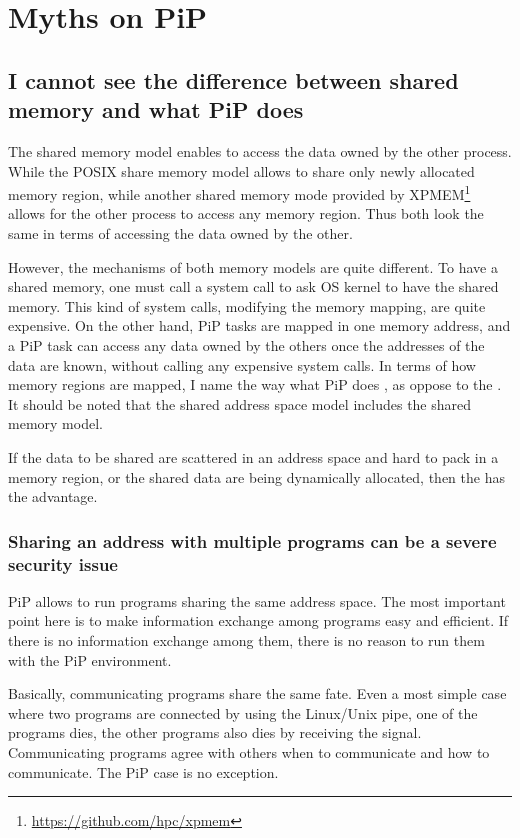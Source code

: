
\section{Myths on PiP}

\subsection*{I cannot see the difference between shared memory and
  what PiP does}\label{sec:shared-memory-myth}

The shared memory model enables to access the data owned by the other
process. While the POSIX share memory model allows to share only newly
allocated memory region, while another shared memory mode provided by 
XPMEM\footnote{\url{https://github.com/hpc/xpmem}} allows for the
other process to access any memory region. Thus both look
the same in terms of accessing the data owned by the other.

However, the mechanisms of both memory models are quite different. To
have a shared memory, one must call a system call to ask OS kernel to
have the shared memory. This kind of system calls, modifying the
memory mapping, are quite expensive. On the other hand, PiP tasks are 
mapped in one memory address, and a PiP task can access any data owned
by the others once the addresses of the data are known, without calling
any expensive system calls. In terms of how memory regions are mapped,
I name the way what PiP does , as
oppose to the . It should be noted that the
shared address space model includes the shared memory model.

If the data to be shared are scattered in an address space and hard to
pack in a memory region, or the shared data are being dynamically
allocated, then the  has the
advantage.  

\subsubsection*{Sharing an address with multiple programs can be a
  severe security issue}\label{sec:security-issue}

PiP allows to run programs sharing the same address space. The
most important point here is to make information exchange among
programs easy and efficient. If there is no information exchange among
them, there is no reason to run them with the PiP environment.

Basically, communicating programs share the same fate. Even a most
simple case where two programs are connected by using the Linux/Unix
pipe, one of the programs dies, the other programs also dies by
receiving the  signal. Communicating programs agree with
others when to communicate and how to communicate. The PiP case is no
exception.

